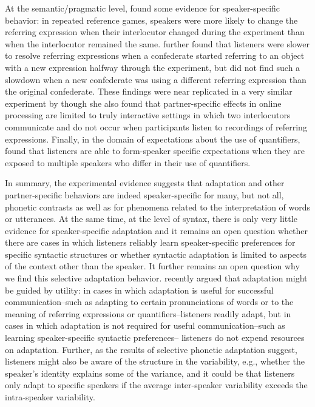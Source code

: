At the semantic/pragmatic level, \cite{BrennanClark1996} found some evidence for speaker-specific behavior: in repeated reference games, speakers were more likely to 
change the referring expression when their interlocutor changed during the experiment than when the interlocutor remained the same. \cite{MetzingBrennan2003} further
found that listeners were slower to resolve referring expressions when a confederate started referring to an object with a new expression halfway through the experiment, 
but did not find such a slowdown when a new confederate was using a different referring expression than the original confederate. These findings were near replicated 
in a very similar experiment by \cite{BrownSchmidt2009} though she also found that partner-specific effects in online processing are limited to truly interactive settings in which
two interlocutors communicate and do not occur when participants listen to recordings of referring expressions. Finally, in the domain of expectations about the use of quantifiers,
\cite{YildirimEtAl2016} found that listeners are able to form-speaker specific expectations when they are exposed to multiple speakers who differ in their use of quantifiers. 

In summary, the experimental evidence suggests that adaptation and other partner-specific behaviors are indeed speaker-specific for many, but not all, phonetic contrasts as
well as for phenomena related to the interpretation of words or utterances. At the same time, at the level of syntax, there is only very little evidence for speaker-specific
adaptation and it remains an open question whether there are cases in which listeners reliably learn speaker-specific preferences for specific syntactic structures or whether syntactic 
adaptation is limited to aspects of the context other than the speaker. It further remains an open question why we find this selective adaptation behavior. \cite{OstrandFerreira2019} recently
argued that adaptation might be guided by utility: in cases in which adaptation is useful for successful communication--such as adapting to certain pronunciations of words or to the meaning
of referring expressions or quantifiers--listeners readily adapt, but in cases in which adaptation is not required for useful communication--such as learning speaker-specific syntactic preferences--
listeners do not expend resources on adaptation. Further, as the results of selective phonetic adaptation suggest, listeners might also be aware of the structure in the variability, e.g., whether the speaker's
identity explains some of the variance, and it could be that listeners only adapt to specific speakers if the average inter-speaker variability exceeds the intra-speaker variability.

